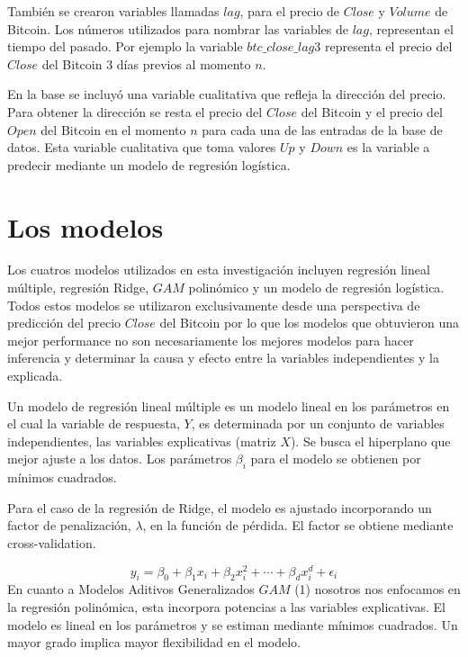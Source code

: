 \documentclass[a4paper,12pt,twocolumn]{article}
\begin{document}
También se crearon variables llamadas $lag$, para el precio de $Close$ y $Volume$ de Bitcoin. Los números utilizados para nombrar las variables de $lag$, representan el tiempo del pasado. Por ejemplo la variable $btc\_close\_lag3$ representa el precio del $Close$ del Bitcoin 3 días previos al momento $n$.~\cite{forecastinBitcoinClosing}   

En la base se incluyó una variable cualitativa que refleja la dirección del precio. Para obtener la dirección se resta el precio del $Close$ del Bitcoin y el precio del $Open$ del Bitcoin en el momento $n$ para cada una de las entradas de la base de datos. Esta variable cualitativa que toma valores $Up$ y $Down$  es la variable a predecir mediante un modelo de regresión logística. 

\section{Los modelos}

Los cuatros modelos utilizados en esta investigación incluyen regresión lineal múltiple, regresión Ridge, $GAM$ polinómico y un modelo de regresión logística. Todos estos modelos se utilizaron exclusivamente desde una perspectiva de predicción del precio $Close$ del Bitcoin por lo que los modelos que obtuvieron una mejor performance no son necesariamente los mejores modelos para hacer inferencia y determinar la causa y efecto entre la variables independientes y la explicada. 

Un modelo de regresión lineal múltiple es un modelo lineal en los parámetros en el cual la variable de respuesta, $Y$, es determinada por un conjunto de variables independientes, las variables explicativas (matriz $X$).
Se busca el hiperplano que mejor ajuste a los datos. Los parámetros $\beta_i$ para el modelo se obtienen por mínimos cuadrados.

Para el caso de la regresión de Ridge, el modelo es ajustado incorporando un factor de penalización, $\lambda$, en la función de pérdida. El factor se obtiene mediante cross-validation.

\begin{equation}
y_{i}=\beta_{0}+\beta_{1} x_{i}+\beta_{2} x_{i}^{2}+\cdots+\beta_{d} x_{i}^{d}+\epsilon_{i}
\end{equation}
En cuanto a Modelos Aditivos Generalizados $GAM$ (1) nosotros nos enfocamos en la regresión polinómica, esta incorpora potencias a las variables explicativas. El modelo es lineal en los parámetros y se estiman mediante mínimos cuadrados. Un mayor grado implica mayor flexibilidad en el modelo. 
\end{document}
